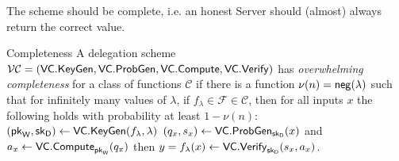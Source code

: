\begin{definition}
\end{definition}     
   
     

\noindent
The scheme should be complete, i.e. an honest Server should (almost) always return the correct value. 
\begin{definition}{Completeness}
\label{def:vc-completeness}
A delegation scheme ${\cal VC} = (\mathsf{VC.KeyGen},\mathsf{VC.ProbGen},\mathsf{VC.Compute},\mathsf{VC.Verify})$ has \textit{overwhelming completeness} for a class of functions $\mathcal{C}$ if  there is a function $\nu(n) = \mathsf{neg}(\lambda)$ such that for infinitely many values of $\lambda$, if $f_\lambda \in \mathcal{F} \in \mathcal{C}$, then for all 
inputs $x$ 
the following holds with probability at least $1-\nu(n)$:  
  $(\mathsf{pk}_{\mathsf{W}}, \mathsf{sk}_{\mathsf{D}}) \gets \mathsf{VC.KeyGen}(f_\lambda, \lambda)$
$(q_x,s_x) \gets \mathsf{VC.ProbGen}_{\mathsf{sk}_{\mathsf{D}}}(x)$ and 
  $a_x \gets \mathsf{VC.Compute}_{\mathsf{pk}_{\mathsf{W}}}(q_x)$ then $y=f_{\lambda}(x) \gets \mathsf{VC.Verify}_{\mathsf{sk}_{\mathsf{D}}}(s_x,a_x)$.
\end{definition}




